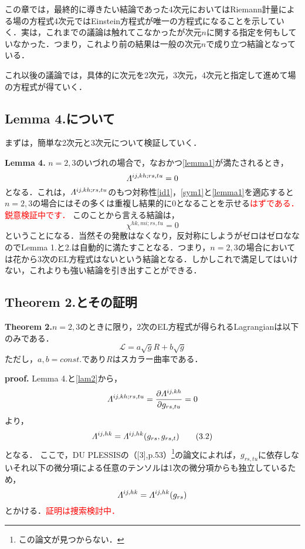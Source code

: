 \documentclass[main]{subfiles}
\begin{document}
この章では，最終的に導きたい結論であった4次元においてはRiemann計量による場の方程式4次元ではEinstein方程式が唯一の方程式になることを示していく．実は，これまでの議論は触れてこなかったが次元\(n\)に関する指定を何もしていなかった．つまり，これより前の結果は一般の次元\(n\)で成り立つ結論となっている．

これ以後の議論では，具体的に次元を2次元，3次元，4次元と指定して進めて場の方程式が得ていく．
\subsection{Lemma 4.について}
まずは，簡単な2次元と3次元について検証していく．

\textbf{Lemma 4.}
\(n=2,3\)のいづれの場合で，なおかつ\eqref{lemma1}が満たされるとき，
\begin{equation*}
    \varLambda^{ij,kh;rs,tu}=0
\end{equation*}
となる．これは，\(\varLambda^{ij,kh;rs,tu}\)のもつ対称性\eqref{id1}，\eqref{sym1}と\eqref{lemma1}を適応すると\(n=2,3\)の場合にはその多くは重複し結果的に0となることを示せる\textcolor{red}{はずである．鋭意検証中です．}
このことから言える結論は，
\begin{equation*}
    \chi ^{hk,mi;rs,tu}=0
\end{equation*}
ということになる．当然その発散はなくなり，反対称にしようがゼロはゼロななのでLemma 1.と2.は自動的に満たすことなる．つまり，\(n=2,3\)の場合においては花から3次のEL方程式はないという結論となる．しかしこれで満足してはいけない，これよりも強い結論を引き出すことができる．
\subsection{Theorem 2.とその証明}
\textbf{Theorem 2.}\(n=2,3\)のときに限り，2次のEL方程式が得られるLagrangianは以下のみである．
\begin{equation*}
    \mathscr{L} = a\sqrt{g}R + b\sqrt{g}
    \tag{3.1}\label{seclag}
\end{equation*}
ただし，\(a,b=const.\)であり\(R\)はスカラー曲率である．

\textbf{proof.}
Lemma 4.と\eqref{lam2}から，
\begin{equation*}
    \varLambda^{ij,kh;rs,tu}= \dfrac{\partial \varLambda^{ij,kh}}{\partial g_{rs,tu} } =0
\end{equation*}
より，
\begin{equation*}
    \varLambda^{ij,hk} = \varLambda^{ij,hk}(g_{rs},g_{rs,t})
    \tag{3.2}\label{3.2}
\end{equation*}
となる．
ここで，DU PLESSISの（[3],p.53）\footnote{この論文が見つからない．}の論文によれば，\(g_{rs,tu}\)に依存しないそれ以下の微分項による任意のテンソルは1次の微分項からも独立しているため，
\begin{equation*}
    \varLambda^{ij,hk} = \varLambda^{ij,hk}(g_{rs})
\end{equation*}
とかける．\textcolor{red}{証明は捜索検討中．}
\end{document}
